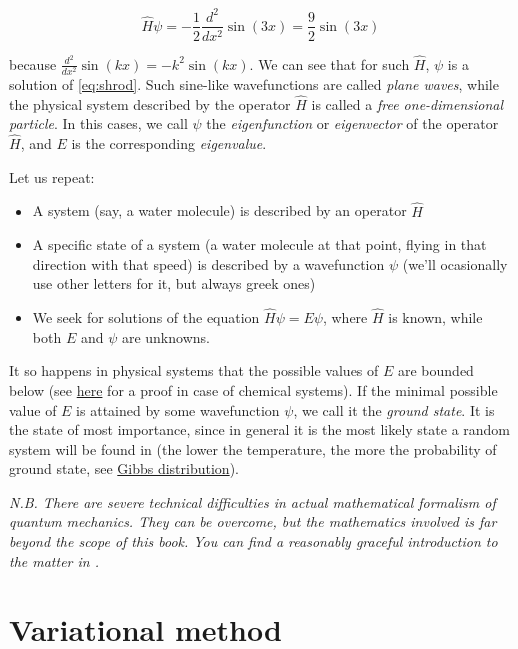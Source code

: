 \documentclass{article}
\begin{document}
\begin{equation} \hat H \psi = -\frac{1}{2} \frac{d^2}{dx^2} \sin(3x) = \frac{9}{2} \sin(3x) \end{equation}

because \(\frac{d^2}{dx^2} \sin(kx) = -k^2 \sin(kx)\). We can see that for such \(\hat H\), \(\psi\) is a solution of \eqref{eq:shrod}. Such sine-like wavefunctions are called \textit{plane waves}, while the physical system described by the operator \(\hat H\) is called a \textit{free one-dimensional particle}. In this cases, we call \(\psi\) the \textit{eigenfunction} or \textit{eigenvector} of the operator \(\hat H\), and \(E\) is the corresponding \textit{eigenvalue}.

Let us repeat:
\begin{itemize}
\item A system (say, a water molecule) is described by an operator \(\hat H\)
\item A specific state of a system (a water molecule at that point, flying in that direction with that speed) is described by a wavefunction \(\psi\) (we'll ocasionally use other letters for it, but always greek ones)
\item We seek for solutions of the equation \(\hat H \psi = E \psi\), where \(\hat H\) is known, while both \(E\) and \(\psi\) are unknowns. 
\end{itemize}

It so happens in physical systems that the possible values of \(E\) are bounded below (see \href{https://www.themathcitadel.com/energy-levels-of-molecules-are-bounded-below/}{here} for a proof in case of chemical systems). If the minimal possible value of \(E\) is attained by some wavefunction \(\psi\), we call it the \textit{ground state}. It is the state of most importance, since in general it is the most likely state a random system will be found in (the lower the temperature, the more the probability of ground state, see \href{https://en.wikipedia.org/wiki/Boltzmann_distribution}{Gibbs distribution}).

\textit{N.B. There are severe technical difficulties in actual mathematical formalism of quantum mechanics. They can be overcome, but the mathematics involved is far beyond the scope of this book. You can find a reasonably graceful introduction to the matter in \cite{ref:hall}.}

\section{Variational method} \label{sec:var}
\end{document}
